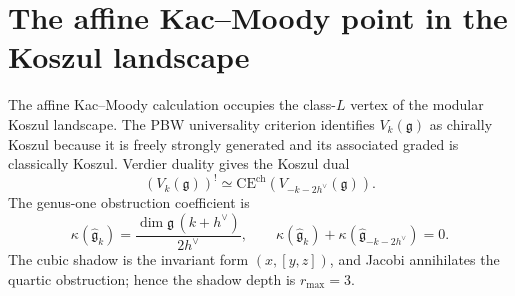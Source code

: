 \documentclass[11pt]{article}
\theoremstyle{plain}
\theoremstyle{definition}
\theoremstyle{remark}
\newcommand{\fg}{\mathfrak{g}}
\newcommand{\CE}{\mathrm{CE}}
\numberwithin{equation}{section}
\begin{document}
\section{The affine Kac--Moody point in the Koszul landscape}
\label{sec:programme}

The affine Kac--Moody calculation occupies the class-\(L\) vertex of
the modular Koszul landscape. The PBW universality criterion identifies
\(V_k(\fg)\) as chirally Koszul because it is freely strongly generated
and its associated graded is classically Koszul. Verdier duality gives
the Koszul dual
\[
(V_k(\fg))^! \simeq \CE^{\mathrm{ch}}(V_{-k-2h^\vee}(\fg)).
\]
The genus-one obstruction coefficient is
\[
\kappa(\widehat{\fg}_k)=\frac{\dim\fg\,(k+h^\vee)}{2h^\vee},
\qquad
\kappa(\widehat{\fg}_k)+\kappa(\widehat{\fg}_{-k-2h^\vee})=0.
\]
The cubic shadow is the invariant form \((x,[y,z])\), and Jacobi
annihilates the quartic obstruction; hence the shadow depth is
\(r_{\max}=3\).
\end{document}
